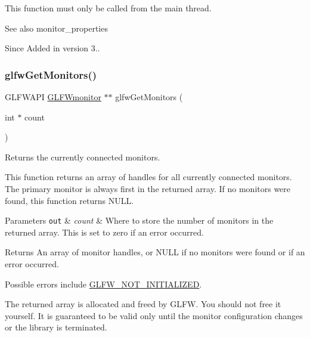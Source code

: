 This function must only be called from the main thread.

\begin{DoxySeeAlso}{See also}
monitor\+\_\+properties
\end{DoxySeeAlso}
\begin{DoxySince}{Since}
Added in version 3.. 
\end{DoxySince}
\mbox{\label{group__monitor_ga8c78e5db186ee10d00c053faf81998af}} 
\subsubsection{\texorpdfstring{glfw\+Get\+Monitors()}{glfwGetMonitors()}}
{\footnotesize\ttfamily G\+L\+F\+W\+A\+PI \hyperlink{group__monitor_ga8d9efd1cde9426692c73fe40437d0ae3}{G\+L\+F\+Wmonitor} $\ast$$\ast$ glfw\+Get\+Monitors (\begin{DoxyParamCaption}\item[{int $\ast$}]{count }\end{DoxyParamCaption})}



Returns the currently connected monitors. 

This function returns an array of handles for all currently connected monitors. The primary monitor is always first in the returned array. If no monitors were found, this function returns {\ttfamily N\+U\+LL}.


\begin{DoxyParams}[1]{Parameters}
\mbox{\tt out}  & {\em count} & Where to store the number of monitors in the returned array. This is set to zero if an error occurred. \\
\hline
\end{DoxyParams}
\begin{DoxyReturn}{Returns}
An array of monitor handles, or {\ttfamily N\+U\+LL} if no monitors were found or if an error occurred.
\end{DoxyReturn}
Possible errors include \hyperlink{group__errors_ga2374ee02c177f12e1fa76ff3ed15e14a}{G\+L\+F\+W\+\_\+\+N\+O\+T\+\_\+\+I\+N\+I\+T\+I\+A\+L\+I\+Z\+ED}.

The returned array is allocated and freed by G\+L\+FW. You should not free it yourself. It is guaranteed to be valid only until the monitor configuration changes or the library is terminated.

